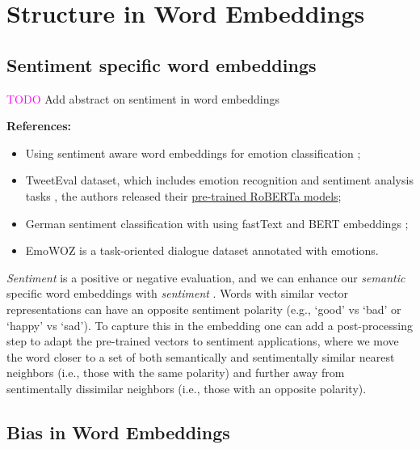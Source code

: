 \documentclass[11pt, a4paper]{amsart}
\begin{document}
\section{Structure in Word Embeddings}

\subsection{Sentiment specific word embeddings}

\textcolor{magenta}{TODO} Add abstract on sentiment in word embeddings

\noindent \textbf{References:}
\begin{itemize}
	\item Using sentiment aware word embeddings for emotion classification \cite{sentiment-aware-word-embedding-emotion-2019};
	\item TweetEval dataset, which includes emotion recognition and sentiment analysis tasks \cite{barbieri-etal-2020-tweeteval}, the authors released their \href{https://huggingface.co/cardiffnlp/twitter-roberta-base-sentiment}{pre-trained RoBERTa models};
	\item German sentiment classification with using fastText and BERT embeddings \cite{guhr-etal-2020-training};
	\item EmoWOZ \cite{DBLP:journals/corr/abs-2109-04919} is a task-oriented dialogue dataset annotated with emotions.
\end{itemize}

{
	\color{blue}
	
	\emph{Sentiment} is a positive or negative evaluation, and we can enhance our \emph{semantic} specific word embeddings with \emph{sentiment} \cite{yu-etal-2017-refining}.
	Words with similar vector representations can have an opposite sentiment polarity (e.g., `good' vs `bad' or `happy' vs `sad').
	To capture this in the embedding one can add a post-processing step to adapt the pre-trained vectors to sentiment applications,
	where we move the word closer to a set of both semantically and sentimentally similar nearest neighbors (i.e., those with the same polarity) and further away from sentimentally dissimilar neighbors (i.e., those with an opposite polarity).
} %



\subsection{Bias in Word Embeddings}
\end{document}
